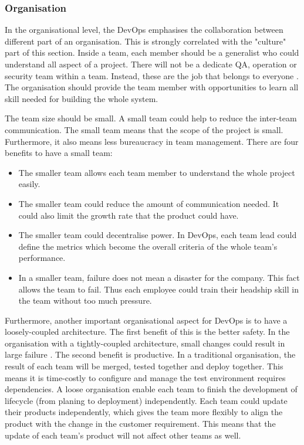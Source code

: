 \subsubsection[]{Organisation}
In the organisational level, the DevOps emphasises the collaboration between different part of an organisation. This is strongly correlated with the "culture" part of this section. Inside a team, each member should be a generalist who could understand all aspect of a project. There will not be a dedicate QA, operation or security team within a team. Instead, these are the job that belongs to everyone \cite{feitelson2013development}\cite{kim2016devops}. The organisation should provide the team member with opportunities to learn all skill needed for building the whole system. 
\par
The team size should be small. A small team could help to reduce the inter-team communication. The small team means that the scope of the project is small. Furthermore, it also means less bureaucracy in team management. There are four benefits \cite{kim2016devops} to have a small team:
\begin{itemize}
    \item The smaller team allows each team member to understand the whole project easily.
    \item The smaller team could reduce the amount of communication needed. It could also limit the growth rate that the product could have.
    \item The smaller team could decentralise power. In DevOps, each team lead could define the metrics which become the overall criteria of the whole team's performance.
    \item In a smaller team, failure does not mean a disaster for the company. This fact allows the team to fail. Thus each employee could train their headship skill in the team without too much pressure. 
\end{itemize} 
\par
Furthermore, another important organisational aspect for DevOps is to have a loosely-coupled architecture. 
The first benefit of this is the better safety.
In the organisation with a tightly-coupled architecture, small changes could result in large failure \cite{kim2016devops}.
The second benefit is productive. In a traditional organisation, the result of each team will be merged, tested together and deploy together. This means it is time-costly to configure and manage the test environment requires dependencies. A loose organisation enable each team to finish the development of lifecycle (from planing to deployment) independently. Each team could update their products independently, which gives the team more flexibly to align the product with the change in the customer requirement. This means that the update of each team's product will not affect other teams as well.
